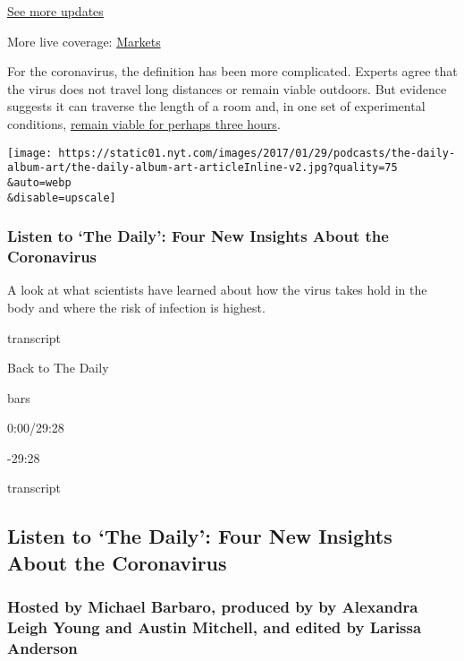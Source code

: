 \href{https://www.nytimes.com/2020/08/04/world/coronavirus-cases.html?action=click\&pgtype=Article\&state=default\&region=MAIN_CONTENT_1\&context=storylines_live_updates}{See
more updates}

More live coverage:
\href{https://www.nytimes.com/live/2020/08/04/business/stock-market-today-coronavirus?action=click\&pgtype=Article\&state=default\&region=MAIN_CONTENT_1\&context=storylines_live_updates}{Markets}

For the coronavirus, the definition has been more complicated. Experts
agree that the virus does not travel long distances or remain viable
outdoors. But evidence suggests it can traverse the length of a room
and, in one set of experimental conditions,
\href{https://www.nytimes.com/2020/03/17/health/coronavirus-surfaces-aerosols.html}{remain
viable for perhaps three hours}.

\texttt{[image: https://static01.nyt.com/images/2017/01/29/podcasts/the-daily-album-art/the-daily-album-art-articleInline-v2.jpg?quality=75\\\&auto=webp\\\&disable=upscale]}

\hypertarget{listen-to-the-daily-four-new-insights-about-the-coronavirus}{%
\subsubsection{Listen to `The Daily': Four New Insights About the
Coronavirus}\label{listen-to-the-daily-four-new-insights-about-the-coronavirus}}

A look at what scientists have learned about how the virus takes hold in
the body and where the risk of infection is highest.

transcript

Back to The Daily

bars

0:00/29:28

-29:28

transcript

\hypertarget{listen-to-the-daily-four-new-insights-about-the-coronavirus-1}{%
\subsection{Listen to `The Daily': Four New Insights About the
Coronavirus}\label{listen-to-the-daily-four-new-insights-about-the-coronavirus-1}}

\hypertarget{hosted-by-michael-barbaro-produced-by-by-alexandra-leigh-young-and-austin-mitchell-and-edited-by-larissa-anderson}{%
\subsubsection{Hosted by Michael Barbaro, produced by by Alexandra Leigh
Young and Austin Mitchell, and edited by Larissa
Anderson}\label{hosted-by-michael-barbaro-produced-by-by-alexandra-leigh-young-and-austin-mitchell-and-edited-by-larissa-anderson}}

